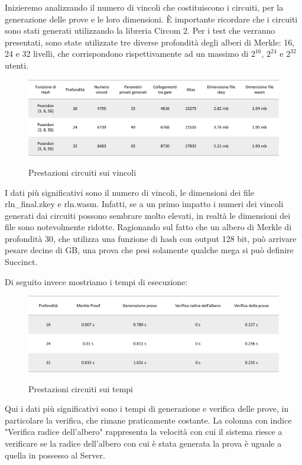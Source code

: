 Inizieremo analizzando il numero di vincoli che costituiscono i circuiti, per la generazione delle prove e le loro
dimensioni. È importante ricordare che i circuiti sono stati generati utilizzando la libreria Circom 2. Per i test che
verranno presentati, sono state utilizzate tre diverse profondità degli alberi di Merkle: 16, 24 e 32 livelli, che
corrispondono rispettivamente ad un massimo di $2^{16}$, $2^{24}$ e $2^{32}$ utenti.
\begin{figure}[H]
    \centering
    \includegraphics[width=15cm]{./chapters/3.poc/images/5.1.bench.png}
    \label{fig:1.bench}
    \captionsetup{justification=centering}
    \caption{Prestazioni circuiti sui vincoli}
\end{figure}
I dati più significativi sono il numero di vincoli, le dimensioni dei file rln\_final.zkey e rln.wasm. Infatti, se a un
primo impatto i numeri dei vincoli generati dai circuiti possono sembrare molto elevati, in realtà le dimensioni dei
file sono notevolmente ridotte. Ragionando sul fatto che un albero di Merkle di profondità 30, che utilizza una
funzione di hash con output 128 bit, può arrivare pesare decine di GB, una prova che pesi solamente qualche mega si può
definire Succinct. 

Di seguito invece mostriamo i tempi di esecuzione:
\begin{figure}[H]
    \centering
    \includegraphics[width=15cm]{./chapters/3.poc/images/5.2.bench.png}
    \label{fig:2.bench}
    \captionsetup{justification=centering}
    \caption{Prestazioni circuiti sui tempi}
\end{figure}

Qui i dati più significativi sono i tempi di generazione e verifica delle prove, in particolare la verifica, che rimane
praticamente costante. La colonna con indice "Verifica radice dell'albero" rappresenta la velocità con cui il sistema
riesce a verificare se la radice dell'albero con cui è stata generata la prova è uguale a quella in possesso al Server.